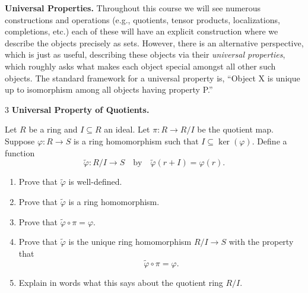 \documentclass[Notebook.tex]{subfiles}
\begin{document}
\newpage

\hrulefill

\textbf{Universal Properties.} Throughout this course we will see numerous constructions and operations (e.g., quotients, tensor products, localizations, completions, etc.) each of these will have an explicit construction where we describe the objects precisely as sets. However, there is an alternative perspective, which is just as useful, describing these objects via their \emph{universal properties}, which roughly asks what makes each object special amongst all other such objects. The standard framework for a universal property is, ``Object X is unique up to isomorphism among all objects having property P.''

\hrulefill


\begin{problem}{3}
    \textbf{Universal Property of Quotients.} 
    
    Let $R$ be a ring and $I \subseteq R$ an ideal. Let $\pi\colon R \to R/I$ be the quotient map. Suppose $\varphi \colon R \to S$ is a ring homomorphism such that $I \subseteq \ker(\varphi)$. Define a function
    \[
    \widetilde{\varphi} \colon R/I \to S
    \quad \text{by} \quad
    \widetilde{\varphi}(r+I)=\varphi(r).
    \]
    \begin{enumerate}[label=(\alph*),ref=\theenumi\alph*]
    	\item Prove that $\widetilde{\varphi}$ is well-defined.

    	\item Prove that $\widetilde{\varphi}$ is a ring homomorphism.

    	\item Prove that $\widetilde{\varphi} \circ \pi = \varphi$.

    	\item Prove that $\widetilde{\varphi}$ is the unique ring homomorphism $R/I \to S$ with the property that
    	\[
  	  \widetilde{\varphi}\circ \pi = \varphi.
    	\]
    	\item Explain in words what this says about the quotient ring $R/I$.
    \end{enumerate}
\end{problem}
\end{document}
